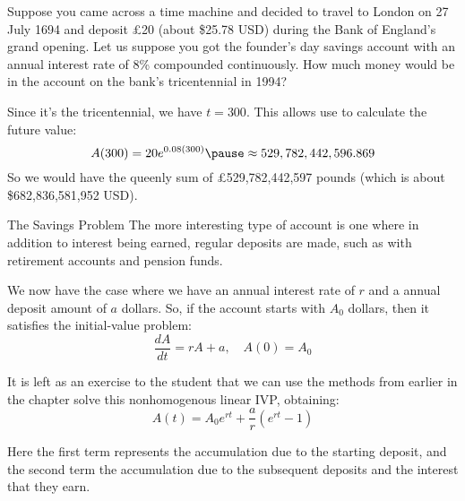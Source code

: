 \documentclass{beamer}
\begin{document}
\begin{frame}
\begin{example}
Suppose you came across a time machine and decided to travel to London on 27 July 1694 and deposit \pounds20 (about \$25.78 USD) during the Bank of England's grand opening. Let us suppose you got the founder's day savings account with an annual interest rate of 8\% compounded continuously. How much money would be in the account on the bank's tricentennial in 1994?\pause

\vspace{2mm}
Since it's the tricentennial, we have $t=300$. This allows use to calculate the  future value:
\begin{equation*}
A(300) = 20e^{0.08(300)}\pause \approx 529,782,442,596.869
\end{equation*}\pause
So we would have the queenly sum of \pounds529,782,442,597 pounds (which is about \$682,836,581,952 USD).
\end{example}
\end{frame}

\begin{frame}
\begin{block}{The Savings Problem}
The more interesting type of account is one where in addition to interest being earned, regular deposits are made, such as with retirement accounts and pension funds.\pause

\vspace{2mm}
We now have the case where we have an annual interest rate of $r$ and a annual deposit amount of $a$ dollars. So, if the account starts with $A_0$ dollars, then it satisfies the initial-value problem:
\begin{equation*}
\dfrac{dA}{dt} = rA+a,\quad A(0)=A_0
\end{equation*}\pause

\vspace{-4mm}
It is left as an exercise to the student that we can use the methods from earlier in the chapter solve this nonhomogenous linear IVP, obtaining:
\begin{equation*}
A(t) = A_0 e^{rt} + \dfrac{a}{r}(e^{rt}-1)
\end{equation*}

\vspace{-1mm}
Here the first term represents the accumulation due to the starting deposit, and the second term the accumulation due to the subsequent deposits and the interest that they earn.
\end{block}
\end{frame}
\end{document}
